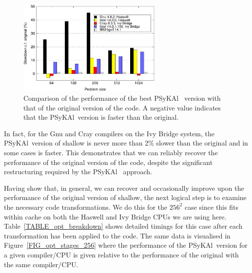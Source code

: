\documentclass[journal]{IEEEtran}
\newcommand{\psykal}{{PS}y{KA}l\ }
\begin{document}
\begin{figure}[!t]
\centering
\includegraphics[width=2.8in]{slowdown_summary}
\caption{Comparison of the performance of the best \psykal
version with that of the original version of the code. A negative value 
indicates that the \psykal version is faster than the original.}
\label{FIG_slowdown_summary}
\end{figure}

In fact, for the Gnu and Cray compilers on the Ivy Bridge system, the
\psykal version of shallow is never more than 2\% slower than the
original and in some cases is faster.  This demonstrates that we can
reliably recover the performance of the original version of the code,
despite the significant restructuring required by the \psykal
approach.

Having show that, in general, we can recover and occasionally improve
upon the performance of the original version of shallow, the next
logical step is to examine the necessary code transformations.  We do
this for the $256^{2}$ case since this fits within cache on both the
Haswell and Ivy Bridge CPUs we are using here.
Table~\ref{TABLE_opt_breakdown} shows detailed timings for this case
after each transformation has been applied to the code. The same data
is visualised in Figure~\ref{FIG_opt_stages_256} where the performance
of the \psykal version for a given compiler/CPU is given relative to
the performance of the original with the same compiler/CPU. 
\end{document}
